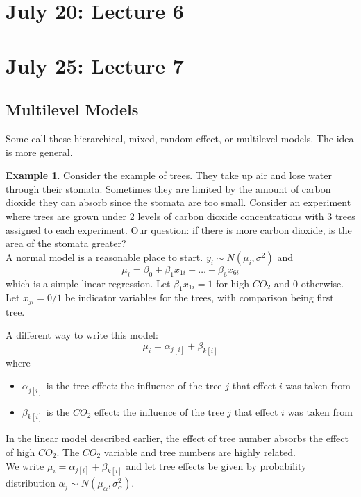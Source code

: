 \documentclass[12pt, a4paper]{article}
\theoremstyle{definition}
\newtheorem{example}{Example}
\begin{document}
	\section{July 20: Lecture 6}
	
	\section{July 25: Lecture 7}
	
	\subsection{Multilevel Models}
	
	Some call these hierarchical, mixed, random effect, or multilevel models. The idea is more general.
	
	\begin{example}
		Consider the example of trees. They take up air and lose water through their stomata. Sometimes they are limited by the amount of carbon dioxide they can absorb since the stomata are too small. Consider an experiment where trees are grown under 2 levels of carbon dioxide concentrations with 3 trees assigned to each experiment. Our question: if there is more carbon dioxide, is the area of the stomata greater?\\
		
		A normal model is a reasonable place to start. $y_i \sim N(\mu_i, \sigma^2)$ and
		$$
			\mu_i = \beta_0 + \beta_1 x_{1i} + \ldots + \beta_6 x_{6i}
		$$
		which is a simple linear regression. Let $\beta_1 x_{1i} = 1$ for high $CO_2$ and $0$ otherwise. Let $x_{ji} = 0/1$ be indicator variables for the trees, with comparison being first tree.
		
		A different way to write this model:
		$$
			\mu_i = \alpha_{j[i]} + \beta_{k[i]}
		$$
		where
		\begin{itemize}
			\item $\alpha_{j[i]}$ is the tree effect: the influence of the tree $j$ that effect $i$ was taken from
			\item $\beta_{k[i]}$ is the $CO_2$ effect: the influence of the tree $j$ that effect $i$ was taken from
		\end{itemize}
	
		In the linear model described earlier, the effect of tree number absorbs the effect of high $CO_2$. The $CO_2$ variable and tree numbers are highly related.\\
		
		We write
		$
		\mu_i = \alpha_{j[i]} + \beta_{k[i]}
		$
		and let tree effects be given by probability distribution $\alpha_j \sim N(\mu_\alpha, \sigma^2_\alpha)$.
	\end{example}
	
	
	
	
	
	
	
	
	
\end{document}
